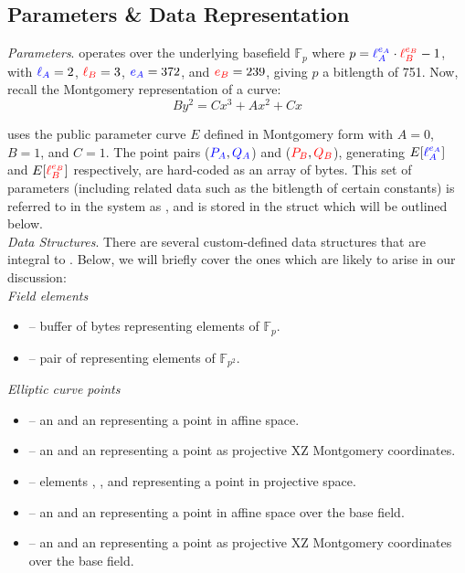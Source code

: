 \subsection{Parameters \& Data Representation}

\noindent
\emph{Parameters}. \sidh operates over the underlying basefield $\mathbb{F}_{p}$ where $p = \textcolor{blue}{\ell_{A}^{e_A}}\cdot\textcolor{red}{\ell_{B}^{e_B}} - 1$, with $\textcolor{blue}{\ell_{A}} = 2$, $\textcolor{red}{\ell_{B}} = 3$, $\textcolor{blue}{e_A} = 372$, and $\textcolor{red}{e_B} = 239$, giving $p$ a bitlength of 751. Now, recall the Montgomery representation of a curve:
$$
By^2 = Cx^3 + Ax^2 + Cx
$$

\sidh uses the public parameter curve $E$ defined in Montgomery form with $A = 0$, $B = 1$, and $C = 1$. The point pairs ($\textcolor{blue}{P_A},\textcolor{blue}{Q_A}$) and ($\textcolor{red}{P_B}, \textcolor{red}{Q_B}$), generating $E[\textcolor{blue}{\ell_{A}^{e_A}}]$ and $E[\textcolor{red}{\ell_{B}^{e_B}}]$ respectively, are hard-coded as an array of bytes. This set of parameters (including related data such as the bitlength of certain constants) is referred to in the system as , and is stored in the struct  which will be outlined below.\\

\noindent
\emph{Data Structures}. There are several custom-defined data structures that are integral to \sidh. Below, we will briefly cover the ones which are likely to arise in our discussion:\\

\emph{Field elements}
\begin{itemize}
	\item {} -- buffer of bytes representing elements of $\mathbb{F}_{p}$.
	\item {} -- pair of  representing elements of $\mathbb{F}_{p^2}$.
\end{itemize}

\emph{Elliptic curve points}
\begin{itemize}
	\item {} -- an   and an   representing a point in affine space.
	\item {} -- an   and an   representing a point as projective XZ Montgomery coordinates.
	\item {} --  elements , , and  representing a point in projective space.
	\item {} -- an   and an   representing a point in affine space over the base field.
	\item {} -- an   and an   representing a point as projective XZ Montgomery coordinates over the base field.
\end{itemize}

